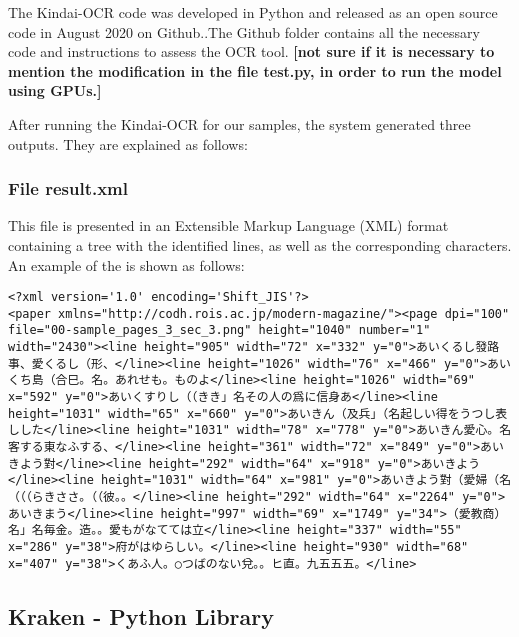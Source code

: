 \documentclass[
]{article}
\begin{document}
The Kindai-OCR code was developed in Python and released as an open
source code in August 2020 on Github..The Github folder contains all the
necessary code and instructions to assess the OCR tool. \textbf{{[}not
sure if it is necessary to mention the modification in the file test.py,
in order to run the model using GPUs.{]}}

After running the Kindai-OCR for our samples, the system generated three
outputs. They are explained as follows:

\hypertarget{file-result.xml}{%
\subsubsection{File result.xml}\label{file-result.xml}}

This file is presented in an Extensible Markup Language (XML) format
containing a tree with the identified lines, as well as the
corresponding characters. An example of the is shown as follows:

\begin{verbatim}
<?xml version='1.0' encoding='Shift_JIS'?>
<paper xmlns="http://codh.rois.ac.jp/modern-magazine/"><page dpi="100" file="00-sample_pages_3_sec_3.png" height="1040" number="1" width="2430"><line height="905" width="72" x="332" y="0">あいくるし發路事、愛くるし（形、</line><line height="1026" width="76" x="466" y="0">あいくち島（合巳。名。あれせも。ものよ</line><line height="1026" width="69" x="592" y="0">あいくすりし（（きき」名その人の爲に信身あ</line><line height="1031" width="65" x="660" y="0">あいきん（及兵」（名起しい得をうつし表しした</line><line height="1031" width="78" x="778" y="0">あいきん愛心。名客する東なふする、</line><line height="361" width="72" x="849" y="0">あいきよう對</line><line height="292" width="64" x="918" y="0">あいきよう</line><line height="1031" width="64" x="981" y="0">あいきよう對（愛婦（名（（（らきささ。（（彼。。</line><line height="292" width="64" x="2264" y="0">あいきまう</line><line height="997" width="69" x="1749" y="34">（愛教商）名」名毎金。造。。愛もがなてては立</line><line height="337" width="55" x="286" y="38">府がはゆらしい。</line><line height="930" width="68" x="407" y="38">くあふ人。○つばのない兌。。ヒ直。九五五五。</line>
\end{verbatim}

\hypertarget{kraken---python-library}{%
\subsection{Kraken - Python Library}\label{kraken---python-library}}
\end{document}
